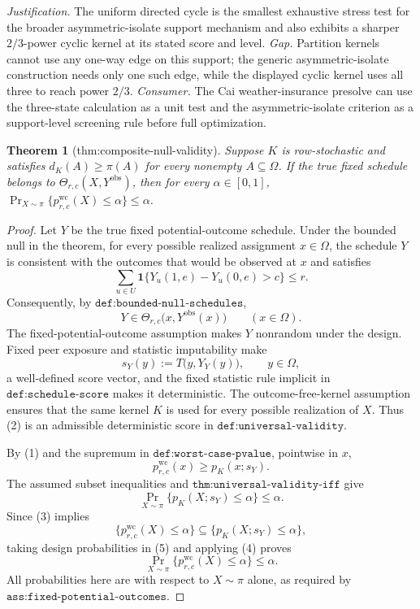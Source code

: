 \documentclass{article}
\newtheorem{theorem}{Theorem}
\begin{document}
\par\smallskip\noindent \textit{Justification.} The uniform directed cycle is the smallest exhaustive stress test for the broader asymmetric-isolate support mechanism and also exhibits a sharper \(2/3\)-power cyclic kernel at its stated score and level. \textit{Gap.} Partition kernels cannot use any one-way edge on this support; the generic asymmetric-isolate construction needs only one such edge, while the displayed cyclic kernel uses all three to reach power \(2/3\). \textit{Consumer.} The Cai weather-insurance presolve can use the three-state calculation as a unit test and the asymmetric-isolate criterion as a support-level screening rule before full optimization.

\begin{theorem}[thm:composite-null-validity]\label{thm:composite-null-validity}
Suppose \(K\) is row-stochastic and satisfies \(d_K(A)\geq\pi(A)\) for every nonempty \(A\subseteq\Omega\). If the true fixed schedule belongs to \(\Theta_{r,c}(X,Y^{\mathrm{obs}})\), then for every \(\alpha\in[0,1]\), \(\Pr_{X\sim\pi}\{p^{\mathrm{wc}}_{r,c}(X)\leq\alpha\}\leq\alpha\).
\end{theorem}
\begin{proof}
Let \(Y\) be the true fixed potential-outcome schedule.  Under the bounded null in the theorem, for every possible realized assignment \(x\in\Omega\), the schedule \(Y\) is consistent with the outcomes that would be observed at \(x\) and satisfies
\[
 \sum_{u\in U}\mathbf 1\{Y_u(1,e)-Y_u(0,e)>c\}\leq r.
\]
Consequently, by \(\texttt{def:bounded-null-schedules}\),
\[
 Y\in\Theta_{r,c}\bigl(x,Y^{\mathrm{obs}}(x)\bigr)
 \qquad(x\in\Omega).
\tag{1}
\]
The fixed-potential-outcome assumption makes \(Y\) nonrandom under the design.  Fixed peer exposure and statistic imputability make
\[
 s_Y(y):=T\bigl(y,Y_Y(y)\bigr),\qquad y\in\Omega,
\tag{2}
\]
a well-defined score vector, and the fixed statistic rule implicit in \(\texttt{def:schedule-score}\) makes it deterministic.  The outcome-free-kernel assumption ensures that the same kernel \(K\) is used for every possible realization of \(X\).  Thus (2) is an admissible deterministic score in \(\texttt{def:universal-validity}\).

By (1) and the supremum in \(\texttt{def:worst-case-pvalue}\), pointwise in \(x\),
\[
 p^{\mathrm{wc}}_{r,c}(x)
 \geq p_K(x;s_Y).
\tag{3}
\]
The assumed subset inequalities and \(\texttt{thm:universal-validity-iff}\) give
\[
 \Pr_{X\sim\pi}\{p_K(X;s_Y)\leq\alpha\}\leq\alpha.
\tag{4}
\]
Since (3) implies
\[
 \{p^{\mathrm{wc}}_{r,c}(X)\leq\alpha\}
 \subseteq
 \{p_K(X;s_Y)\leq\alpha\},
\tag{5}
\]
taking design probabilities in (5) and applying (4) proves
\[
 \Pr_{X\sim\pi}\{p^{\mathrm{wc}}_{r,c}(X)\leq\alpha\}
 \leq\alpha.
\]
All probabilities here are with respect to \(X\sim\pi\) alone, as required by \(\texttt{ass:fixed-potential-outcomes}\).
\end{proof}
\end{document}
